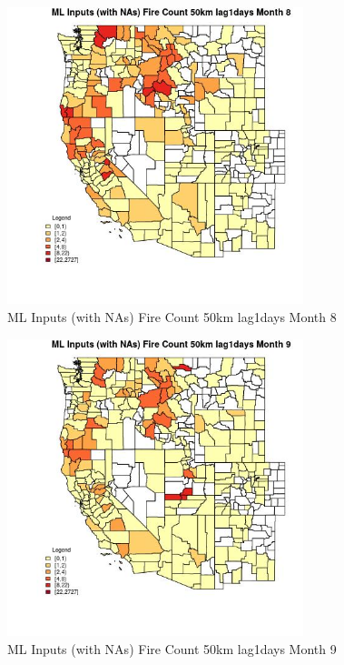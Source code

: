 \begin{figure} 
\centering  
\includegraphics[width=0.77\textwidth]{Code_Outputs/Report_ML_input_PM25_Step4_part_f_de_duplicated_aves_prioritize_24hr_obswNAs_CountyFire_Count_50km_lag1daysmedianMonth8.jpg} 
\caption{\label{fig:Report_ML_input_PM25_Step4_part_f_de_duplicated_aves_prioritize_24hr_obswNAsCountyFire_Count_50km_lag1daysmedianMonth8}ML Inputs (with NAs) Fire Count 50km lag1days Month 8} 
\end{figure} 
 

\begin{figure} 
\centering  
\includegraphics[width=0.77\textwidth]{Code_Outputs/Report_ML_input_PM25_Step4_part_f_de_duplicated_aves_prioritize_24hr_obswNAs_CountyFire_Count_50km_lag1daysmedianMonth9.jpg} 
\caption{\label{fig:Report_ML_input_PM25_Step4_part_f_de_duplicated_aves_prioritize_24hr_obswNAsCountyFire_Count_50km_lag1daysmedianMonth9}ML Inputs (with NAs) Fire Count 50km lag1days Month 9} 
\end{figure} 
 


